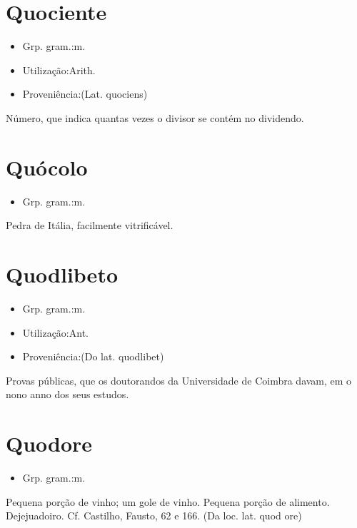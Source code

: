 \section{Quociente}
\begin{itemize}
\item {Grp. gram.:m.}
\end{itemize}
\begin{itemize}
\item {Utilização:Arith.}
\end{itemize}
\begin{itemize}
\item {Proveniência:(Lat. \textunderscore quociens\textunderscore )}
\end{itemize}
Número, que indica quantas vezes o divisor se contém no dividendo.
\section{Quócolo}
\begin{itemize}
\item {Grp. gram.:m.}
\end{itemize}
Pedra de Itália, facilmente vitrificável.
\section{Quodlibeto}
\begin{itemize}
\item {Grp. gram.:m.}
\end{itemize}
\begin{itemize}
\item {Utilização:Ant.}
\end{itemize}
\begin{itemize}
\item {Proveniência:(Do lat. \textunderscore quodlibet\textunderscore )}
\end{itemize}
Provas públicas, que os doutorandos da Universidade de Coimbra davam, em o nono anno dos seus estudos.
\section{Quodore}
\begin{itemize}
\item {Grp. gram.:m.}
\end{itemize}
Pequena porção de vinho; um gole de vinho.
Pequena porção de alimento.
Dejejuadoiro. Cf. Castilho, \textunderscore Fausto\textunderscore , 62 e 166.
(Da loc. lat. \textunderscore quod ore\textunderscore )
